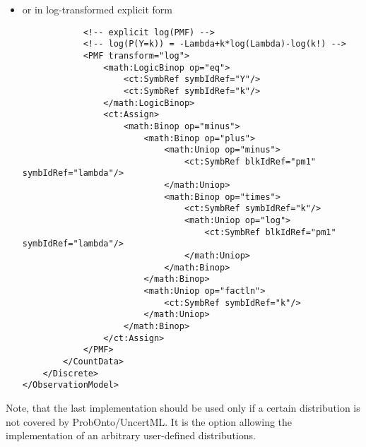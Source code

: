 \begin{itemize}
\item 
or in log-transformed explicit form
\lstset{language=XML}
\begin{lstlisting}
            <!-- explicit log(PMF) -->
            <!-- log(P(Y=k)) = -Lambda+k*log(Lambda)-log(k!) -->
            <PMF transform="log">
                <math:LogicBinop op="eq">
                    <ct:SymbRef symbIdRef="Y"/>
                    <ct:SymbRef symbIdRef="k"/>
                </math:LogicBinop>
                <ct:Assign>
                    <math:Binop op="minus">
                        <math:Binop op="plus">
                            <math:Uniop op="minus">
                                <ct:SymbRef blkIdRef="pm1" symbIdRef="lambda"/>
                            </math:Uniop>
                            <math:Binop op="times">
                                <ct:SymbRef symbIdRef="k"/>
                                <math:Uniop op="log">
                                    <ct:SymbRef blkIdRef="pm1" symbIdRef="lambda"/>
                                </math:Uniop>
                            </math:Binop>
                        </math:Binop>
                        <math:Uniop op="factln">
                            <ct:SymbRef symbIdRef="k"/>
                        </math:Uniop>
                    </math:Binop>
                </ct:Assign>
            </PMF>
        </CountData>
    </Discrete>
</ObservationModel>
\end{lstlisting}
\end{itemize}
Note, that the last implementation should be used only if a certain 
distribution is not covered by ProbOnto/UncertML. It is the option allowing
the implementation of an arbitrary user-defined distributions.

